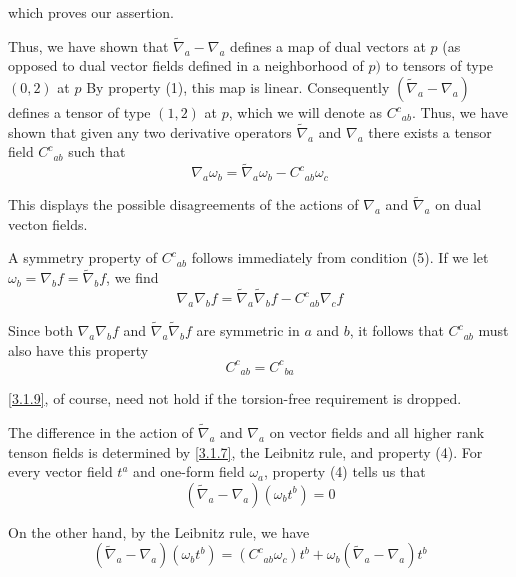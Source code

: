which proves our assertion.

Thus, we have shown that $\tilde{\nabla}_a-\nabla_a$ defines a map of dual vectors at $p$ (as opposed to dual vector fields defined in a neighborhood of $p)$ to tensors of type $(0,2)$ at $p$ By property (1), this map is linear. Consequently $(\tilde{\nabla}_a-\nabla_a)$ defines a tensor of type $(1,2)$ at $p$, which we will denote as ${C^c}_{ab}.$ Thus, we have shown that given any two derivative operators $\tilde{\nabla}_a$ and $\nabla_a$ there exists a tensor field ${C^c}_{ab}$ such that
\begin{equation}
    \nabla_a\omega_{b}=\tilde{\nabla}_a\omega_{b}-{C^c}_{ab}\omega_c
    \label{3.1.7}
\end{equation}

This displays the possible disagreements of the actions of $\nabla_a$ and $\tilde{\nabla}_a$ on dual vecton fields.

A symmetry property of ${C^c}_{ab}$ follows immediately from condition (5). If we let $\omega_{b}=\nabla_{b}f=\tilde{\nabla}_{b}f$, we find
\begin{equation}
    \nabla_a\nabla_{b}f=\tilde{\nabla}_a\tilde{\nabla}_{b}f-{C^c}_{ab}\nabla_cf
    \label{3.1.8}
\end{equation}

Since both $\nabla_a\nabla_bf$ and $\tilde{\nabla}_a\tilde{\nabla}_bf$ are symmetric in $a$ and $b$, it follows that ${C^c}_{ab}$ must also have this property
\begin{equation}
    {C^c}_{ab}={C^c}_{ba}
    \label{3.1.9}
\end{equation}

\eqref{3.1.9}, of course, need not hold if the torsion-free requirement is dropped.

The difference in the action of $\tilde{\nabla}_a$ and $\nabla_a$ on vector fields and all higher rank tenson fields is determined by \eqref{3.1.7}, the Leibnitz rule, and property (4). For every vector field $t^a$ and one-form field $\omega_a$, property (4) tells us that
\begin{equation}
    (\tilde{\nabla}_a-\nabla_a)(\omega_bt^b)=0
    \label{3.1.10}
\end{equation}

On the other hand, by the Leibnitz rule, we have
\begin{equation}
    (\tilde{\nabla}_a-\nabla_a)(\omega_bt^b)=({C^c}_{ab}\omega_c)t^b+\omega_b(\tilde{\nabla}_a-\nabla_a)t^b
    \label{3.1.11}
\end{equation}

